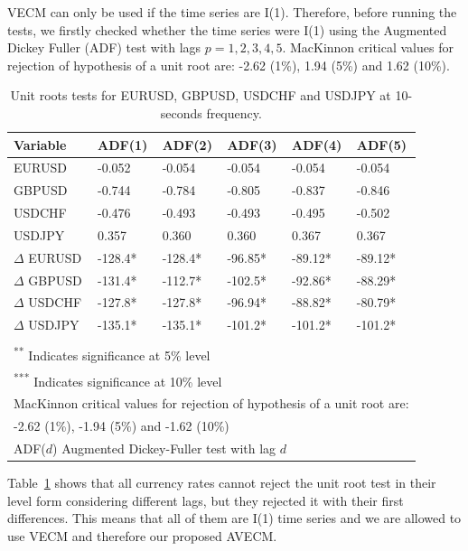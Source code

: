 VECM can only be used if the time series are I(1). Therefore, 
before running the tests, we firstly checked whether the time series were
I(1) using the Augmented Dickey Fuller (ADF) test with lags $p=1,2,3,4,5$. 
MacKinnon \cite{mackinnon2010} critical values for rejection of hypothesis of a unit root are: -2.62 (1\%), 1.94 (5\%) and 1.62 (10\%).
\begin{table}[ht]
\label{tab:adf}
\centering
\begin{tabular}{llllll}
\toprule
{Variable} & {ADF(1)} & {ADF(2)} & {ADF(3)} & {ADF(4)} & {ADF(5)}\\ 
\midrule
EURUSD &  -0.052   & -0.054  & -0.054  & -0.054  & -0.054  \\
GBPUSD &  -0.744  & -0.784  & -0.805  & -0.837  & -0.846  \\
USDCHF &  -0.476   & -0.493  & -0.493  & -0.495  & -0.502  \\
USDJPY &  0.357   & 0.360  & 0.360  & 0.367  & 0.367  \\
$\Delta$ EURUSD & -128.4*  & -128.4*  & -96.85* & -89.12*   & -89.12*\\
$\Delta$ GBPUSD & -131.4*  & -112.7*  & -102.5* & -92.86*   & -88.29*\\
$\Delta$ USDCHF & -127.8*  & -127.8*  & -96.94* & -88.82*   & -80.79*\\
$\Delta$ USDJPY & -135.1*  & -135.1*  & -101.2* & -101.2*   & -101.2*\\
\bottomrule
\addlinespace[1ex]
\multicolumn{6}{l}{ \textsuperscript{*} Indicates significance at 1\% level} \\
\multicolumn{6}{l}{ \textsuperscript{**} Indicates significance at 5\% level} \\
\multicolumn{6}{l}{ \textsuperscript{***} Indicates significance at 10\% level} \\
\multicolumn{6}{l}{MacKinnon critical values for rejection of hypothesis of a unit root are:}\\
\multicolumn{6}{l}{ -2.62 (1\%), -1.94 (5\%) and -1.62 (10\%)}\\
\multicolumn{6}{l}{ADF($d$) Augmented Dickey-Fuller test with lag $d$} 
\end{tabular}
\caption{Unit roots tests for EURUSD, GBPUSD, USDCHF and USDJPY at 10-seconds
frequency.}
\end{table}
Table~\ref{tab:adf} shows that all currency rates cannot reject the unit root test in their level form considering different lags, but they rejected it with their first differences. This means that all of
them are I(1) time series and we are allowed to use VECM and therefore our proposed AVECM.


